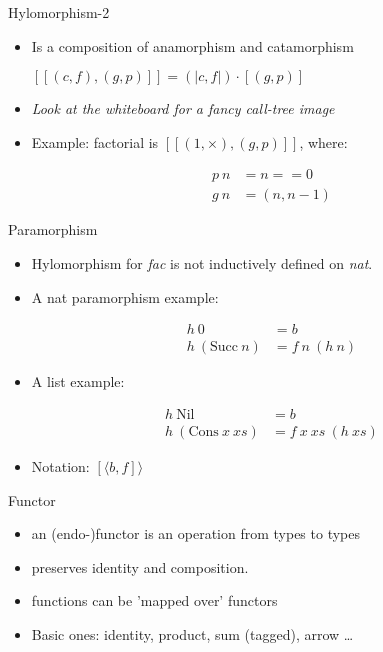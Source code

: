\documentclass{beamer}
\begin{document}
\begin{frame}{Hylomorphism-2}
\begin{itemize}

\item Is a composition of anamorphism and catamorphism

$[\![(c,f), (g,p)]\!] = (\!|c, f|\!) \cdot [\!(g, p)\!]$

\item \textit{Look at the whiteboard for a fancy call-tree image}
\item Example: factorial is $[\![(1, \times), (g,p)]\!]$, where:

\begin{align*}
p\ n &= n == 0 \\
g\ n &= (n, n-1)
\end{align*}
\end{itemize}
\end{frame}


\begin{frame}[fragile]{Paramorphism}

\begin{itemize}
\item Hylomorphism for \textit{fac }is not inductively defined on \textit{nat}.
\item A nat paramorphism example:

\begin{align*}
h\ 0&= b\\
h\ (\text{Succ} \ n ) &= f\ n\ (h\ n)
\end{align*}

\item A list example:

\begin{align*}
h\ \text{Nil}& = b\\
h\ (\text{Cons}\ x\ xs ) &= f\ x\ xs\ (h\ xs)
\end{align*}

\item Notation: $[\!\langle b, f ]\!\rangle$
\end{itemize}

\end{frame}

\begin{frame}{Functor}
\begin{itemize}
\item an (endo-)functor is an operation from types to types
\item preserves identity and composition.
\item functions can be 'mapped over' functors
\item Basic ones: identity, product, sum (tagged), arrow \dots

\end{itemize}

\end{frame}
\end{document}
